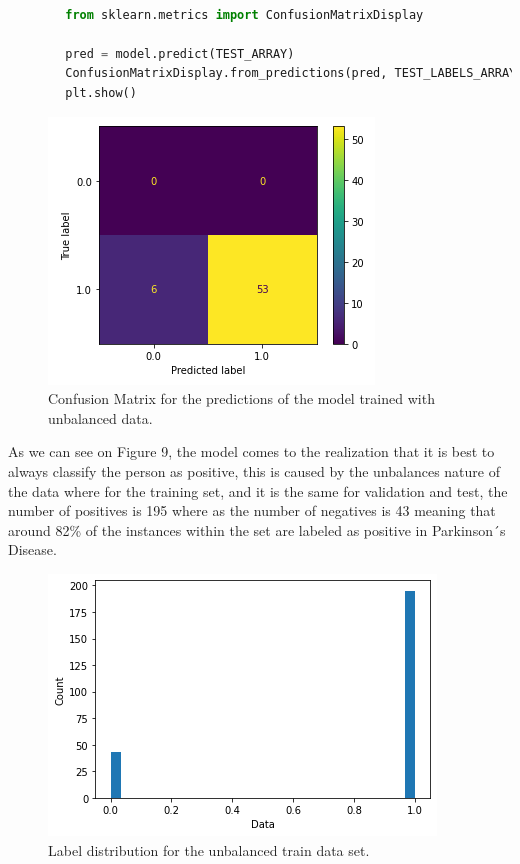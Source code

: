 \documentclass[12pt, a4paper]{article}
\begin{document}
		\vspace{15mm}
	
	\begin{lstlisting}[language=Python]
		
		from sklearn.metrics import ConfusionMatrixDisplay
		
		pred = model.predict(TEST_ARRAY)
		ConfusionMatrixDisplay.from_predictions(pred, TEST_LABELS_ARRAY)
		plt.show()
	\end{lstlisting}

	\vspace{5mm}

	\begin{figure}[H]
		\centering
		\label{UnbalancedConfusionMatrix}
		\includegraphics[scale=1.2]{img/plots/matrizDeConfusion.png}
		\caption{Confusion Matrix for the predictions of the model trained with unbalanced data.}
	\end{figure}
	\vspace{5mm}

	As we can see on Figure 9, the model comes to the realization that it is best to always classify the person as positive, this is caused by the unbalances nature of the data where for the training set, and it is the same for validation and test, the number of positives is 195 where as the number of negatives is 43 meaning that around 82\% of the instances within the set are labeled as positive in Parkinson´s Disease.
	
	\begin{figure}[H]
		\centering
		\label{UnbalancedTrainDataSet}
		\includegraphics{img/plots/unbalancedTrainDataGraph.png}
		\caption{Label distribution for the unbalanced train data set.}
	\end{figure}
	
\end{document}
